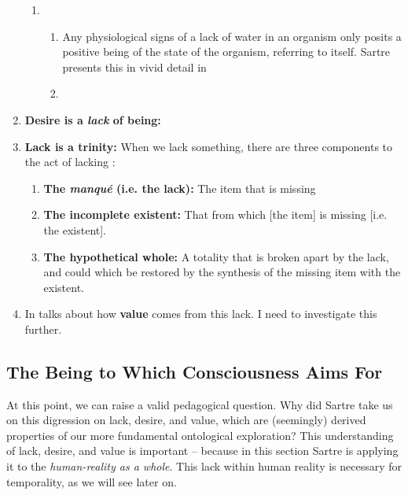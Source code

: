 \begin{enumerate}
\begin{enumerate}
    \item {}
    \begin{enumerate}
      \item Any physiological signs of a lack of water in an organism only posits a positive being of the state of the organism, referring to itself. Sartre presents this in vivid detail in \autocite[139]{sartre}
      \item {}
    \end{enumerate}
  \end{enumerate}
  \item \textbf{Desire is a \emph{lack} of being:} 
  \item \textbf{Lack is a trinity:} When we lack something, there are three components to the act of lacking \autocite[138]{sartre}:
  \begin{enumerate}
    \item \textbf{The \emph{manqué} (i.e. the lack):} The item that is missing
    \item \textbf{The incomplete existent:} That from which [the item] is missing [i.e. the existent].
    \item \textbf{The hypothetical whole:} A totality that is broken apart by the lack, and could which be restored by the synthesis of the missing item with the existent.
  \end{enumerate}
  \item In \autocite[139]{sartre} talks about how \textbf{value} comes from this lack. I need to investigate this further.
\end{enumerate}

\subsection*{The Being to Which Consciousness Aims For}

At this point, we can raise a valid pedagogical question. Why did Sartre take us on this digression on lack, desire, and value, which are (seemingly) derived properties of our more fundamental ontological exploration? This understanding of lack, desire, and value is important -- because in this section Sartre is applying it to the \emph{human-reality as a whole}. This lack within human reality is necessary for temporality, as we will see later on.


